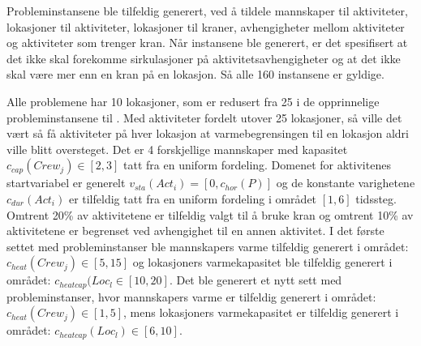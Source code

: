 Probleminstansene ble tilfeldig generert, ved å tildele mannskaper til aktiviteter, lokasjoner til aktiviteter, lokasjoner til kraner, avhengigheter mellom aktiviteter og aktiviteter som trenger kran. Når instansene ble generert, er det spesifisert at det ikke skal forekomme sirkulasjoner på aktivitetsavhengigheter og at det ikke skal være mer enn en kran på en lokasjon. Så alle 160 instansene er gyldige.

Alle problemene har 10 lokasjoner, som er redusert fra 25 i de opprinnelige probleminstansene til \bht. Med aktiviteter fordelt utover 25 lokasjoner, så ville det vært så få aktiviteter på hver lokasjon at varmebegrensingen til en lokasjon aldri ville blitt oversteget. Det er 4 forskjellige mannskaper med kapasitet $ c_{cap}(Crew_{j}) \in [2,3] $ tatt fra en uniform fordeling. Domenet for aktivitenes startvariabel er generelt $ v_{sta}(Act_{i}) = [0,c_{hor}(P)] $ og de konstante varighetene $ c_{dur}(Act_{i}) $ er tilfeldig tatt fra en uniform fordeling i området $ [1,6] $ tidssteg. Omtrent 20\% av aktivitetene er tilfeldig valgt til å bruke kran og omtrent 10\% av aktivitetene er begrenset ved avhengighet til en annen aktivitet. I det første settet med probleminstanser ble mannskapers varme tilfeldig generert i området: $c_{heat}(Crew_{j}) \in [5,15]$ og lokasjoners varmekapasitet ble tilfeldig generert i området: $c_{heatcap}(Loc_{l} \in [10,20]$. Det ble generert et nytt sett med probleminstanser, hvor mannskapers varme er tilfeldig generert i området: $c_{heat}(Crew_{j}) \in [1,5]$, mens lokasjoners varmekapasitet er tilfeldig generert i området: $c_{heatcap}(Loc_{l}) \in [6,10]$.